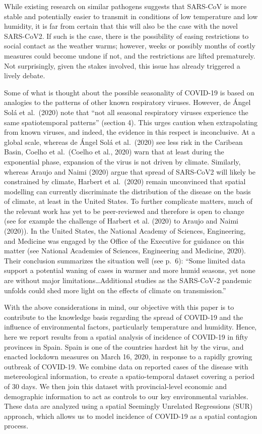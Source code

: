 \documentclass[]{elsarticle} %
\begin{document}
While existing research on similar pathogens suggests that SARS-CoV is
more stable and potentially easier to transmit in conditions of low
temperature and low humidity, it is far from certain that this will also
be the case with the novel SARS-CoV2. If such is the case, there is the
possibility of easing restrictions to social contact as the weather
warms; however, weeks or possibly months of costly measures could become
undone if not, and the restrictions are lifted prematurely. Not
surprisingly, given the stakes involved, this issue has already
triggered a lively debate.

Some of what is thought about the possible seasonality of COVID-19 is
based on analogies to the patterns of other known respiratory viruses.
However, de Ángel Solá et al.~(2020) note that ``not all seasonal
respiratory viruses experience the same spatiotemporal patterns''
(section 4). This urges caution when extrapolating from known viruses,
and indeed, the evidence in this respect is inconclusive. At a global
scale, whereas de Ángel Solá et al.~(2020) see less risk in the Caribean
Basin, Coelho et al.~(Coelho et al., 2020) warn that at least during the
exponential phase, expansion of the virus is not driven by climate.
Similarly, whereas Araujo and Naimi (2020) argue that spread of
SARS-CoV2 will likely be constrained by climate, Harbert et al.~(2020)
remain unconvinced that spatial modelling can currently discriminate the
distribution of the disease on the basis of climate, at least in the
United States. To further complicate matters, much of the relevant work
has yet to be peer-reviewed and therefore is open to change (see for
example the challenge of Harbert et al. (2020) to Araujo and Naimi
(2020)). In the United States, the National Academy of Sciences,
Engineering, and Medicine was engaged by the Office of the Executive for
guidance on this matter (see National Academies of Sciences, Engineering
and Medicine, 2020). Their conclusion summarizes the situation well (see
p.~6): ``Some limited data support a potential waning of cases in warmer
and more humid seasons, yet none are without major
limitations\ldots Additional studies as the SARS-CoV-2 pandemic unfolds
could shed more light on the effects of climate on transmission.''

With the above considerations in mind, our objective with this paper is
to contribute to the knowledge basis regarding the spread of COVID-19
and the influence of environmental factors, particularly temperature and
humidity. Hence, here we report results from a spatial analysis of
incidence of COVID-19 in fifty provinces in Spain. Spain is one of the
countries hardest hit by the virus, and enacted lockdown measures on
March 16, 2020, in response to a rapidly growing outbreak of COVID-19.
We combine data on reported cases of the disease with metereological
information, to create a spatio-temporal dataset covering a period of 30
days. We then join this dataset with provincial-level economic and
demographic information to act as controls to our key environmental
variables. These data are analyzed using a spatial Seemingly Unrelated
Regressions (SUR) approach, which allows us to model incidence of
COVID-19 as a spatial contagion process.
\end{document}
